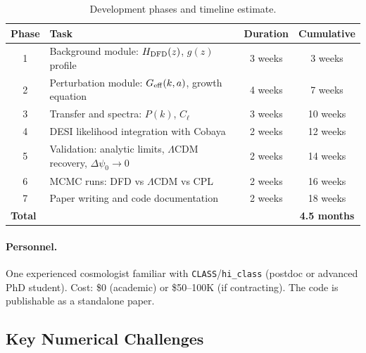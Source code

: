 \documentclass[11pt,a4paper]{article}
\newcommand{\LCDM}{$\Lambda$CDM}
\newcommand{\Geff}{G_{\rm eff}}
\newcommand{\CLASS}{\texttt{CLASS}}
\newcommand{\hiclass}{\texttt{hi\_class}}
\begin{document}
\begin{table}[H]
\centering
\caption{Development phases and timeline estimate.}
\begin{tabular}{clcc}
\toprule
\textbf{Phase} & \textbf{Task} & \textbf{Duration} & \textbf{Cumulative} \\
\midrule
1 & Background module: $H_{\rm DFD}(z)$, $g(z)$ profile &
  3 weeks & 3 weeks \\
2 & Perturbation module: $\Geff(k,a)$, growth equation &
  4 weeks & 7 weeks \\
3 & Transfer and spectra: $P(k)$, $C_\ell$ &
  3 weeks & 10 weeks \\
4 & DESI likelihood integration with Cobaya &
  2 weeks & 12 weeks \\
5 & Validation: analytic limits, \LCDM{} recovery,
  $\Delta\psi_0 \to 0$ & 2 weeks & 14 weeks \\
6 & MCMC runs: DFD vs \LCDM{} vs CPL &
  2 weeks & 16 weeks \\
7 & Paper writing and code documentation &
  2 weeks & 18 weeks \\
\midrule
\multicolumn{2}{l}{\textbf{Total}} & & \textbf{4.5 months} \\
\bottomrule
\end{tabular}
\end{table}

\paragraph{Personnel.} One experienced cosmologist familiar with
\CLASS{}/\hiclass{} (postdoc or advanced PhD student). Cost: \$0
(academic) or \$50--100K (if contracting). The code is publishable
as a standalone paper.

\subsection{Key Numerical Challenges}
\end{document}
